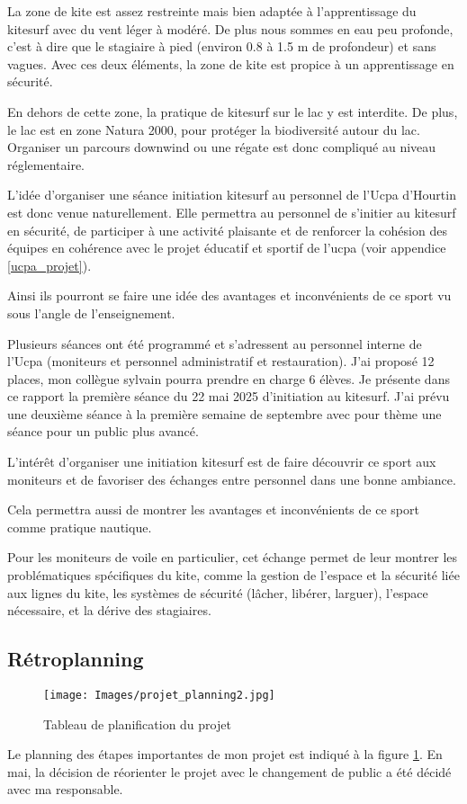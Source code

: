 \documentclass[11pt,a4paper]{report}
\begin{document}
La zone de kite est assez restreinte mais bien adaptée à l'apprentissage
du kitesurf avec du vent léger à modéré. De plus nous sommes en 
eau peu profonde, c'est à dire que le stagiaire à pied (environ 0.8 à 1.5 m
de profondeur) et sans vagues. Avec ces deux éléments, la zone de kite 
est propice à un apprentissage en sécurité.

En dehors de cette zone, la pratique de kitesurf sur le lac
y est interdite. De plus, le lac est en zone Natura 2000\cite{natura2000}, pour
protéger la biodiversité autour du lac.
Organiser un parcours downwind ou une régate est donc compliqué
au niveau réglementaire.

L'idée d'organiser une séance initiation kitesurf
au personnel de l'Ucpa d'Hourtin est donc venue naturellement.
Elle permettra au personnel de s'initier au kitesurf en 
sécurité, de participer à une activité plaisante
et de renforcer la cohésion des équipes en cohérence avec le 
projet éducatif et sportif de l'ucpa (voir appendice \ref{ucpa_projet}).

Ainsi ils pourront se faire une idée des avantages et
inconvénients de ce sport vu sous l'angle de l'enseignement.

Plusieurs séances ont été programmé et s'adressent au personnel 
interne de l'Ucpa (moniteurs et personnel administratif et
restauration). J'ai  proposé 12 places, mon collègue sylvain
pourra prendre en charge 6 élèves.
Je présente dans ce rapport la première séance du 22 mai 2025 d'initiation 
au kitesurf. J'ai prévu une deuxième séance à la première semaine de
septembre avec pour thème une séance pour un public plus avancé.

L'intér\^et d'organiser une initiation kitesurf est de faire découvrir ce
sport aux moniteurs et de favoriser des échanges entre personnel dans 
une bonne ambiance.

Cela permettra aussi de montrer les avantages
et inconvénients de ce sport comme pratique nautique. 

Pour les moniteurs de voile en particulier, cet échange permet
de leur montrer les problématiques spécifiques du kite, 
comme la gestion de l'espace et la sécurité liée aux lignes du kite, 
les  systèmes de sécurité 
(lâcher, libérer, larguer), l'espace nécessaire, et la dérive
des stagiaires.

\subsection{Rétroplanning}
\begin{figure}[h]
\centering
\texttt{[image: Images/projet\_planning2.jpg]} 
\caption{Tableau de planification du projet \label{gantt}}
\end{figure}
Le planning des étapes importantes de mon projet est indiqué
à la figure \ref{gantt}. En mai, la décision de  réorienter 
le projet avec le changement de public a été décidé avec
ma responsable. 
\end{document}
